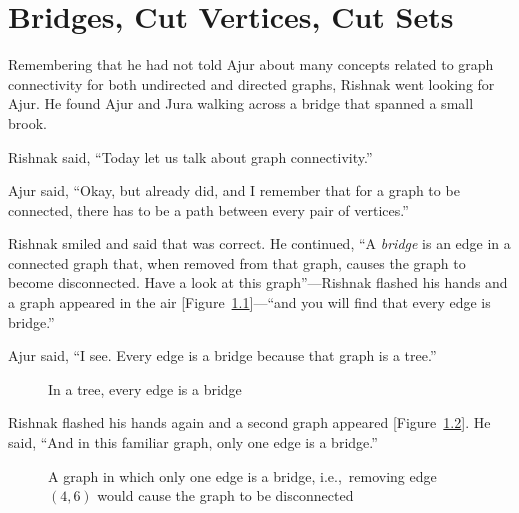 \chapter{Bridges, Cut Vertices, Cut Sets}

Remembering that he had not told Ajur about many concepts related to graph connectivity for both undirected and directed graphs, Rishnak went looking for Ajur. He found Ajur and Jura walking across a bridge that spanned a small brook.

Rishnak said, ``Today let us talk about graph connectivity.''

Ajur said, ``Okay, but already did, and I remember that for a graph to be connected, there has to be a path between every pair of vertices.''

Rishnak smiled and said that was correct. He continued, ``A \textit{bridge} is an edge in a connected graph that, when removed from that graph, causes the graph to become disconnected. Have a look at this graph''---Rishnak flashed his hands and a graph appeared in the air [Figure~\ref{14g1}]---``and you will find that every edge is bridge.'' 

Ajur said, ``I see. Every edge is a bridge because that graph is a tree.''

\begin{figure}
\begin{center}

\caption{In a tree, every edge is a bridge}\label{14g1}
\end{center}
\end{figure}

Rishnak flashed his hands again and a second graph appeared [Figure~\ref{14g2}]. He said, ``And in this familiar graph, only one edge is a bridge.''

\begin{figure}
\begin{center}
\caption{A graph in which only one edge is a bridge, i.e.,~removing edge~$(4,6)$ would cause the graph to be disconnected}\label{14g2}
\end{center}
\end{figure}

